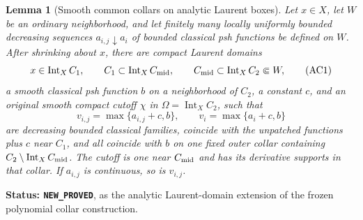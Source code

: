 \documentclass[11pt,a4paper]{article}
\numberwithin{equation}{section}
\newtheorem{lemma}[theorem]{Lemma}
\theoremstyle{definition}
\theoremstyle{remark}
\begin{document}
\begin{lemma}[Smooth common collars on analytic Laurent boxes]
\label{lem:r11-analytic-Laurent-collar}
Let $x\in X$, let $W$ be an ordinary neighborhood, and let finitely
many locally uniformly bounded decreasing sequences
$a_{i,j}\downarrow a_i$ of bounded classical psh functions be defined
on $W$.  After shrinking about $x$, there are compact Laurent domains
\[
 x\in\operatorname{Int}_X C_1,\qquad
 C_1\subset\operatorname{Int}_X C_{\rm mid},\qquad
 C_{\rm mid}\subset\operatorname{Int}_X C_2\Subset W,
 \tag{AC1}
\]
a smooth classical psh function $b$ on a neighborhood of $C_2$,
a constant $c$, and an original smooth compact cutoff $\chi$ in
$\Omega=\operatorname{Int}_X C_2$, such that
\[
 v_{i,j}=\max\{a_{i,j}+c,b\},\qquad
 v_i=\max\{a_i+c,b\}
 \tag{AC2}
\]
are decreasing bounded classical families, coincide with the
unpatched functions plus $c$ near $C_1$, and all coincide with $b$
on one fixed outer collar containing $C_2\setminus
\operatorname{Int}_X C_{\rm mid}$.  The cutoff is one near
$C_{\rm mid}$ and has its derivative supports in that collar.
If $a_{i,j}$ is continuous, so is $v_{i,j}$.
\end{lemma}

\noindent\textbf{Status: \texttt{NEW\_PROVED}}, as the analytic
Laurent-domain extension of the frozen polynomial collar construction.
\end{document}
